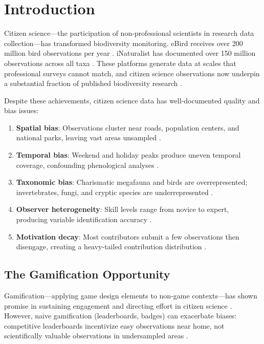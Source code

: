 \section{Introduction}

\label{sec:introduction}

Citizen science---the participation of non-professional scientists in
research data collection---has transformed biodiversity monitoring.
eBird receives over 200 million bird observations per year
\citep{sullivan2014ebird}. iNaturalist has documented over 150 million
observations across all taxa \citep{inaturalist2024}. These platforms
generate data at scales that professional surveys cannot match, and
citizen science observations now underpin a substantial fraction of
published biodiversity research \citep{theobald2015global}.

Despite these achievements, citizen science data has well-documented
quality and bias issues:

\begin{enumerate}[label=(\roman*)]
  \item \textbf{Spatial bias}: Observations cluster near roads,
    population centers, and national parks, leaving vast areas
    unsampled \citep{boakes2010distorted}.
  \item \textbf{Temporal bias}: Weekend and holiday peaks produce
    uneven temporal coverage, confounding phenological analyses
    \citep{courter2013weekend}.
  \item \textbf{Taxonomic bias}: Charismatic megafauna and birds are
    overrepresented; invertebrates, fungi, and cryptic species are
    underrepresented \citep{troudet2017taxonomic}.
  \item \textbf{Observer heterogeneity}: Skill levels range from novice
    to expert, producing variable identification accuracy
    \citep{kelling2015can}.
  \item \textbf{Motivation decay}: Most contributors submit a few
    observations then disengage, creating a heavy-tailed contribution
    distribution \citep{sauermann2015crowd}.
\end{enumerate}

\subsection{The Gamification Opportunity}

Gamification---applying game design elements to non-game contexts---has
shown promise in sustaining engagement and directing effort in citizen
science \citep{bowser2013gamifying, eveleigh2014designing}. However,
naive gamification (leaderboards, badges) can exacerbate biases:
competitive leaderboards incentivize easy observations near home, not
scientifically valuable observations in undersampled areas
\citep{crowston2020citizen}.

